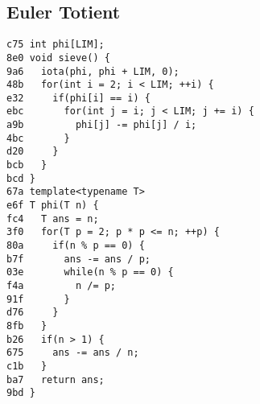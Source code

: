 \documentclass[10pt, a4paper, twoside]{article}
\begin{document}
\subsection{Euler Totient}
\begin{lstlisting}
c75 int phi[LIM];
8e0 void sieve() {
9a6   iota(phi, phi + LIM, 0);
48b   for(int i = 2; i < LIM; ++i) {
e32     if(phi[i] == i) {
ebc       for(int j = i; j < LIM; j += i) {
a9b         phi[j] -= phi[j] / i;
4bc       }
d20     }
bcb   }
bcd }
67a template<typename T>
e6f T phi(T n) {
fc4   T ans = n;
3f0   for(T p = 2; p * p <= n; ++p) {
80a     if(n % p == 0) {
b7f       ans -= ans / p;
03e       while(n % p == 0) {
f4a         n /= p;
91f       }
d76     }
8fb   }
b26   if(n > 1) {
675     ans -= ans / n;
c1b   }
ba7   return ans;
9bd }
\end{lstlisting}
\end{document}
